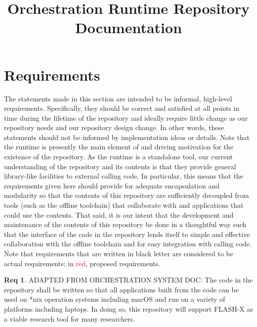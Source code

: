 \documentclass{article}
\title{Orchestration Runtime Repository Documentation}
\newcommand{\FutureFlash}       {\textsf{FLASH}-X\xspace}
\begin{document}
\theoremstyle{definition} %
\newtheorem{req}{Req}[section]
\newtheorem{spec}{Spec}[section]

\maketitle
\section{Requirements}
The statements made in this section are intended to be informal, high-level
requirements.  Specifically, they should be correct and satisfied at all points
in time during the lifetime of the repository and ideally require little change
as our repository needs and our repository design change.  In other words, these
statements should not be informed by implementation ideas or details.  Note that
the runtime is presently the main element of and driving motivation for the
existence of the repository.  As the runtime is a standalone tool, our current
understanding of the repository and its contents is that they provide general
library-like facilities to external calling code.  In particular, this means
that the requirements given here should provide for adequate encapsulation and
modularity so that the contents of this repository are sufficiently decoupled
from tools (such as the offline toolchain) that collaborate with and
applications that could use the contents.  That said, it is our intent that the
development and maintenance of the contents of this repository be done in a
thoughtful way such that the interface of the code in the repository lends itself
to simple and effective collaboration with the offline toolchain and for easy
integration with calling code.\\

Note that requirements that are written in black letter are considered to be actual
requirements; in \textcolor{red}{red}, proposed requirements.

\begin{req}
\label{req:OsAndPlatform}
ADAPTED FROM ORCHESTRATION SYSTEM DOC: The code in the repository shall be written so
that all applications built from the code can be used on *nix operation systems
including macOS and run on a variety of platforms including laptops.  In doing
so, this repository will support \FutureFlash as a viable research tool for many
researchers.
\end{req}
\end{document}
